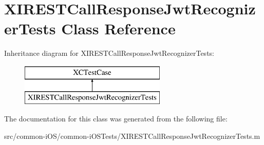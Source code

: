 \hypertarget{interface_x_i_r_e_s_t_call_response_jwt_recognizer_tests}{}\section{X\+I\+R\+E\+S\+T\+Call\+Response\+Jwt\+Recognizer\+Tests Class Reference}
\label{interface_x_i_r_e_s_t_call_response_jwt_recognizer_tests}
Inheritance diagram for X\+I\+R\+E\+S\+T\+Call\+Response\+Jwt\+Recognizer\+Tests\+:\begin{figure}[H]
\begin{center}
\leavevmode
\includegraphics[height=2.000000cm]{interface_x_i_r_e_s_t_call_response_jwt_recognizer_tests}
\end{center}
\end{figure}


The documentation for this class was generated from the following file\+:\begin{DoxyCompactItemize}
\item 
src/common-\/i\+O\+S/common-\/i\+O\+S\+Tests/X\+I\+R\+E\+S\+T\+Call\+Response\+Jwt\+Recognizer\+Tests.\+m\end{DoxyCompactItemize}
